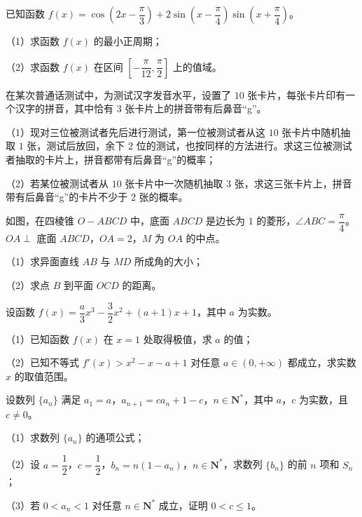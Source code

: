 \begin{question}
已知函数 $f(x)=\cos\left(2x-\dfrac{\pi}{3}\right)+2\sin\left(x-\dfrac{\pi}{4}\right)\sin\left(x+\dfrac{\pi}{4}\right)$。

（1）求函数 $f(x)$ 的最小正周期；

（2）求函数 $f(x)$ 在区间 $\left[-\dfrac{\pi}{12},\dfrac{\pi}{2}\right]$ 上的值域。

\end{question}
\begingroup
\renewenvironment{question}{\Needspace{0.46\textheight}}{}
\begin{question}
在某次普通话测试中，为测试汉字发音水平，设置了 $10$ 张卡片，每张卡片印有一个汉字的拼音，其中恰有 $3$ 张卡片上的拼音带有后鼻音“g”。

（1）现对三位被测试者先后进行测试，第一位被测试者从这 $10$ 张卡片中随机抽取 $1$ 张，测试后放回，余下 $2$ 位的测试，也按同样的方法进行。求这三位被测试者抽取的卡片上，拼音都带有后鼻音“g”的概率；

（2）若某位被测试者从 $10$ 张卡片中一次随机抽取 $3$ 张，求这三张卡片上，拼音带有后鼻音“g”的卡片不少于 $2$ 张的概率。

\Needspace{0.4\textheight}
\end{question}
\endgroup
\begin{question}
如图，在四棱锥 $O-ABCD$ 中，底面 $ABCD$ 是边长为 $1$ 的菱形，$\angle ABC=\dfrac{\pi}{4}$。$OA\perp$ 底面 $ABCD$，$OA=2$，$M$ 为 $OA$ 的中点。

（1）求异面直线 $AB$ 与 $MD$ 所成角的大小；

（2）求点 $B$ 到平面 $OCD$ 的距离。
\nopagebreak[4]
\begin{center}\end{center}
\nopagebreak[4]
\end{question}
\begin{question}
设函数 $f(x)=\dfrac a3x^3-\dfrac32x^2+(a+1)x+1$，其中 $a$ 为实数。

（1）已知函数 $f(x)$ 在 $x=1$ 处取得极值，求 $a$ 的值；

（2）已知不等式 $f'(x)>x^2-x-a+1$ 对任意 $a\in(0,+\infty)$ 都成立，求实数 $x$ 的取值范围。

\end{question}
\begin{question}
设数列 $\{a_n\}$ 满足 $a_1=a$，$a_{n+1}=ca_n+1-c$，$n\in\mathbf N^*$，其中 $a$，$c$ 为实数，且 $c\neq0$。

（1）求数列 $\{a_n\}$ 的通项公式；

（2）设 $a=\dfrac12$，$c=\dfrac12$，$b_n=n(1-a_n)$，$n\in\mathbf N^*$，求数列 $\{b_n\}$ 的前 $n$ 项和 $S_n$；

（3）若 $0<a_n<1$ 对任意 $n\in\mathbf N^*$ 成立，证明 $0<c\leqslant1$。

\end{question}
